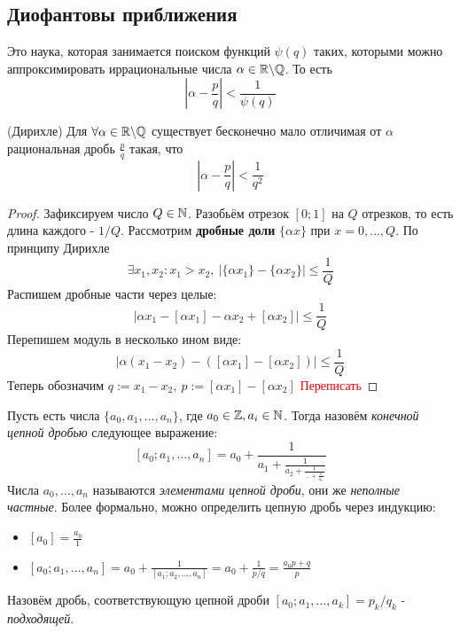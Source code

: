 \subsection{Диофантовы приближения}

Это наука, которая занимается поиском функций $\psi(q)$ таких, которыми можно аппроксимировать иррациональные числа $\alpha \in \mathbb{R} \backslash \mathbb{Q}$. То есть
\[
	\left|\alpha - \frac{p}{q}\right| < \frac{1}{\psi(q)}
\]

\begin{theorem} (Дирихле)
	Для $\forall \alpha \in \mathbb{R} \backslash \mathbb{Q}$ существует бесконечно мало отличимая от $\alpha$ рациональная дробь $\frac{p}{q}$ такая, что
	\[
		\left|\alpha - \frac{p}{q}\right| < \frac{1}{q^2}
	\]
\end{theorem}

\begin{proof}
	Зафиксируем число $Q \in \mathbb{N}$. Разобьём отрезок $[0; 1]$ на $Q$ отрезков, то есть длина каждого - $1 / Q$. Рассмотрим \textbf{дробные доли} $\{\alpha x\}$ при $x = 0, \ldots, Q$. По принципу Дирихле
	\[
		\exists x_1, x_2 \colon x_1 > x_2,\ |\{\alpha x_1\} - \{\alpha x_2\}| \le \frac{1}{Q}
	\]
	Распишем дробные части через целые:
	\[
		|\alpha x_1 - [\alpha x_1] - \alpha x_2 + [\alpha x_2]| \le \frac{1}{Q}
	\]
	Перепишем модуль в несколько ином виде:
	\[
		|\alpha(x_1 - x_2) - ([\alpha x_1] - [\alpha x_2])| \le \frac{1}{Q}
	\]
	Теперь обозначим $q := x_1 - x_2,\ p := [\alpha x_1] - [\alpha x_2]$
	\textcolor{red}{Переписать}
\end{proof}

\begin{definition}
	Пусть есть числа $\{a_0, a_1, \ldots, a_n\}$, где $a_0 \in \mathbb{Z}, a_i \in \mathbb{N}$. Тогда назовём \textit{конечной цепной дробью} следующее выражение:
	\[
		[a_0; a_1, \ldots, a_n] = a_0 + \frac{1}{\displaystyle a_1 + \frac{1}{\displaystyle a_2 + \frac{1}{\displaystyle \ldots + \frac{1}{a_n}}}}
	\]
	Числа $a_0, \ldots, a_n$ называются \textit{элементами цепной дроби}, они же \textit{неполные частные}.
	Более формально, можно определить цепную дробь через индукцию:
	\begin{itemize}
		\item \([a_0] = \frac{a_0}{1}\)
		\item \([a_0; a_1, \ldots, a_n] = a_0 + \displaystyle\frac{1}{[a_1; a_2, \ldots, a_n]} = a_0 + \frac{1}{p/q} = \frac{a_0p + q}{p}\)
	\end{itemize}
\end{definition}

\begin{definition}
	Назовём дробь, соответствующую цепной дроби $[a_0; a_1, \ldots, a_k] = p_k/q_k$ - \textit{подходящей}.
\end{definition}


